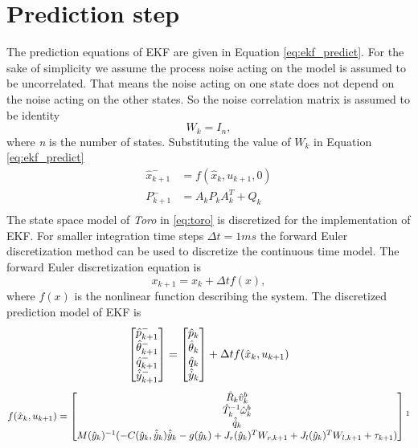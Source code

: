 \section{Prediction step}
The prediction equations of EKF are given in Equation \ref{eq:ekf_predict}. For the sake of simplicity we assume the process noise acting on the model is assumed to be uncorrelated. That means the noise acting on one state does not depend on the noise acting on the other states. So the noise correlation matrix is assumed to be identity $$W_k = I_{n},$$ where \emph{n} is the number of states. Substituting the value of $W_k$ in Equation \ref{eq:ekf_predict}
\begin{equation}
\label{eq:predict}
\begin{split}
\hat{x}_{k+1}^- &= f(\hat{x}_{k},u_{k+1},0)\\
P_{k+1}^- &= A_kP_{k}A_k^T + Q_{k}\\
\end{split}
\end{equation}
The state space model of \emph{Toro} in \ref{eq:toro} is discretized for the implementation of EKF. For smaller integration time steps $\Delta t = 1ms$ the forward Euler discretization method can be used to discretize the continuous time model. The forward Euler discretization equation is $$ x_{k+1} = x_k + \Delta t f(x),$$ where $f(x)$ is the nonlinear function describing the system. The discretized prediction model of EKF is
\begin{equation}
\label{eq:toro_dis}
	\begin{bmatrix}
	\hat{p}_{k+1}^- \\ \hat{\theta}_{k+1}^- \\ \hat{q}_{k+1}^- \\ \hat{\dot{y}}_{k+1}^-
	\end{bmatrix}
	 =   
	 \begin{bmatrix}
	 \hat{p}_k \\ \hat{\theta}_k \\ \hat{q}_k \\ \hat{\dot{y}}_{k}
	\end{bmatrix}	  
	+ \Delta t f(\hat{x}_k,u_{k+1}) \\
\end{equation}
$$ f(\hat{x}_k,u_{k+1}) = 
	\begin{bmatrix}
	\hat R_k \hat v^b_k \\
	\hat T_k^{-1} \hat \omega_k^b  \\
	\hat{\dot{q}}_k\\
	M(\hat{y}_{k})^{-1}(-C(\hat{y}_{k},\hat{\dot{y}}_{k})\hat{\dot{y}}_{k} -g(\hat{y}_{k}) +  J_r(\hat{y}_{k})^{T}W_{r,k+1} +J_l(\hat{y}_{k})^{T}W_{l,k+1} + \tau_{k+1})	
	\end{bmatrix} \footnotemark[1] $$
